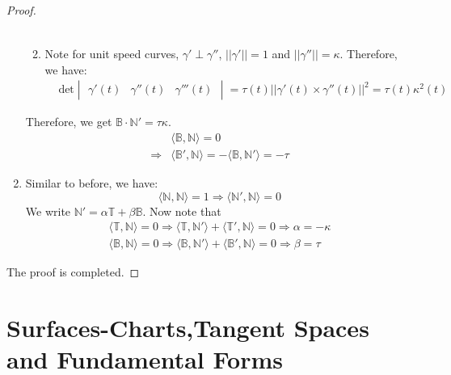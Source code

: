 \documentclass[oneside]{book}\twocolumn
\begin{document}
\begin{proof}
\begin{enumerate}
\begin{enumerate}
\begin{align*}
				\end{align*}
				\item Note for unit speed curves, $\gamma'\perp \gamma''$, $||\gamma'||=1$ and $||\gamma''||=\kappa$. Therefore, we have:
				\begin{align*}
					&\text{det}\begin{vmatrix}
						\gamma'(t)&\gamma''(t)&\gamma'''(t)
					\end{vmatrix}=\tau(t)||\gamma'(t)\times\gamma''(t)||^2=\tau(t)\kappa^2(t)
				\end{align*}
			\end{enumerate}
			Therefore, we get $\mathbb  B\cdot \mathbb  N'=\tau\kappa$.
				\begin{align*}
					&\langle \mathbb  B,\mathbb  N\rangle=0\\
					\Rightarrow&\langle \mathbb  B',\mathbb  N\rangle=-\langle \mathbb  B,\mathbb  N'\rangle=-\tau
				\end{align*}
		\item  Similar to before, we have:
				$$\langle\mathbb  N,\mathbb  N\rangle=1\Rightarrow\langle\mathbb  N',\mathbb  N\rangle=0$$
				We write $\mathbb  N'=\alpha\mathbb  T+\beta \mathbb  B$. Now note that
				\begin{align*}
					\langle \mathbb  T,\mathbb  N\rangle=0\Rightarrow\langle \mathbb  T,\mathbb  N'\rangle+\langle\mathbb  T',\mathbb  N\rangle=0 \Rightarrow \alpha=-\kappa\\
					\langle \mathbb  B,\mathbb  N\rangle=0\Rightarrow\langle \mathbb  B,\mathbb  N'\rangle+\langle\mathbb  B',\mathbb  N\rangle=0 \Rightarrow \beta=\tau
				\end{align*}
	\end{enumerate}
	The proof is completed. 
\end{proof}














\chapter{Surfaces-Charts,Tangent Spaces and Fundamental Forms}
\end{document}
